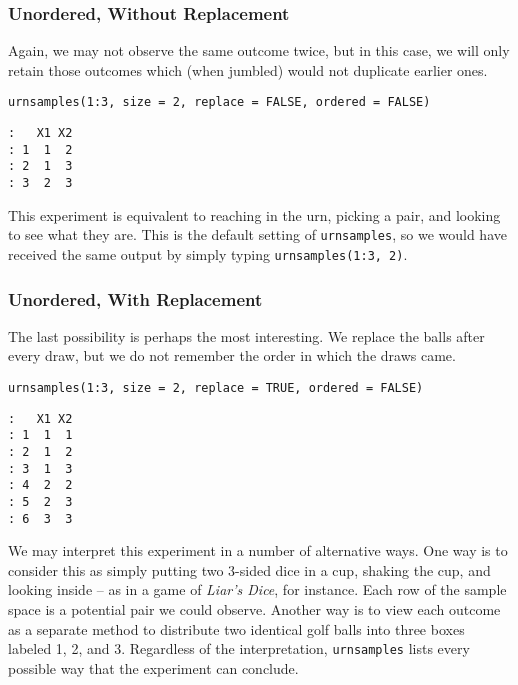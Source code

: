 \subsubsection{Unordered, Without Replacement}
\label{sec-4-1-2-4}

Again, we may not observe the same outcome twice, but in this case, we
will only retain those outcomes which (when jumbled) would not
duplicate earlier ones.

\begin{verbatim}
urnsamples(1:3, size = 2, replace = FALSE, ordered = FALSE) 
\end{verbatim}

\begin{verbatim}
:   X1 X2
: 1  1  2
: 2  1  3
: 3  2  3
\end{verbatim}

This experiment is equivalent to reaching in the urn, picking a pair,
and looking to see what they are. This is the default setting of
\texttt{urnsamples}, so we would have received the same output by simply
typing \texttt{urnsamples(1:3, 2)}.

\subsubsection{Unordered, With Replacement}
\label{sec-4-1-2-5}

The last possibility is perhaps the most interesting. We replace the
balls after every draw, but we do not remember the order in which the
draws came.

\begin{verbatim}
urnsamples(1:3, size = 2, replace = TRUE, ordered = FALSE) 
\end{verbatim}

\begin{verbatim}
:   X1 X2
: 1  1  1
: 2  1  2
: 3  1  3
: 4  2  2
: 5  2  3
: 6  3  3
\end{verbatim}

We may interpret this experiment in a number of alternative ways. One
way is to consider this as simply putting two 3-sided dice in a cup,
shaking the cup, and looking inside -- as in a game of \emph{Liar's Dice},
for instance. Each row of the sample space is a potential pair we
could observe. Another way is to view each outcome as a separate
method to distribute two identical golf balls into three boxes labeled
1, 2, and 3. Regardless of the interpretation, \texttt{urnsamples} lists
every possible way that the experiment can conclude.



